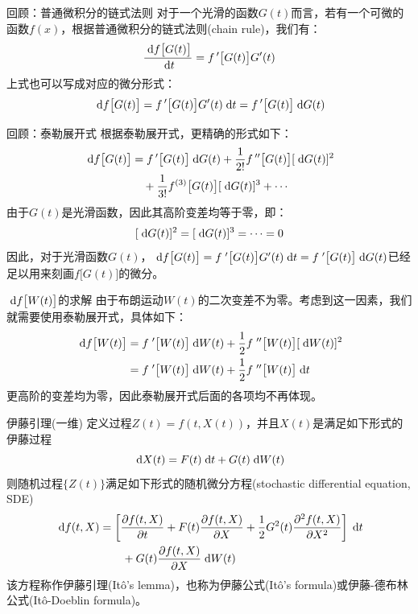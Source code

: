 \documentclass[t]{beamer}
\newcommand{\dif}{{\;\rm d}}
\begin{document}
\begin{frame}{回顾：普通微积分的链式法则}
对于一个光滑的函数$G(t)$而言，若有一个可微的函数$f(x)$，根据普通微积分的链式法则(chain rule)，我们有：
\[\frac{\dif f\big[G(t)\big]}{\dif t}=f\,'\big[G(t)\big]G'(t) \]
上式也可以写成对应的微分形式：
\begin{equation*}
    \dif f\big[G(t)\big]=f\,'\big[G(t)\big]G'(t)\dif t=f\,'\big[G(t)\big] \dif G(t)
\end{equation*}
\end{frame}


\begin{frame}{回顾：泰勒展开式}
根据泰勒展开式，更精确的形式如下：
\begin{equation*}
    \begin{split}
    \dif f\big[G(t)\big]&=f\,'\big[G(t)\big] \dif G(t)+\frac{1}{2!}f\,''\big[G(t)\big] [\dif G(t)]^2\\
    &\quad +\frac{1}{3!}f^{(3)}\big[G(t)\big] [\dif G(t)]^3+\cdots
\end{split}
\end{equation*}
由于$G(t)$是光滑函数，因此其高阶变差均等于零，即：
\[[\dif G(t)]^2=[\dif G(t)]^3=\cdots=0\]
因此，对于光滑函数$G(t)$，$\dif f\big[G(t)\big]=f\;'\big[G(t)\big]G'(t)\dif t=f\;'\big[G(t)\big] \dif G(t)$已经足以用来刻画$f\big[G(t)\big]$的微分。
\end{frame}

\begin{frame}{$\dif f\big[W(t)\big]$的求解}
由于布朗运动$W(t)$的二次变差不为零。考虑到这一因素，我们就需要使用泰勒展开式，具体如下：
\begin{equation*}
\begin{split}
\dif f\big[W(t)\big]&=f\;'\big[W(t)\big] \dif W(t)+\frac{1}{2}f\;''\big[W(t)\big] [\dif W(t)]^2\\
&=f\;'\big[W(t)\big] \dif W(t)+\frac{1}{2}f\;''\big[W(t)\big] \dif t
\end{split}
\end{equation*}
更高阶的变差均为零，因此泰勒展开式后面的各项均不再体现。
\end{frame}

\begin{frame}{伊藤引理(一维)}\normalsize
定义过程$Z(t)=f(t,X(t))$，并且$X(t)$是满足如下形式的伊藤过程
\[\dif X(t)=F(t)\dif t+G(t)\dif W(t)\]
则随机过程$\{Z(t)\}$满足如下形式的随机微分方程(stochastic differential equation, SDE)
\begin{equation*}
\begin{split}
\dif f(t,X)&=\left[\frac{\partial f(t,X)}{\partial t}+F(t) \frac{\partial f(t,X)}{\partial X}+\frac{1}{2}G^2(t) \frac{\partial^2 f(t,X)}{\partial X^2}\right]\dif t\\
&\qquad +G(t) \frac{\partial f(t,X)}{\partial X} \dif W(t)
\end{split}
\end{equation*}
该方程称作伊藤引理(It\^{o}'s lemma)，也称为伊藤公式(It\^{o}'s formula)或伊藤-德布林公式(It\^{o}-Doeblin formula)。
\end{frame}
\end{document}
